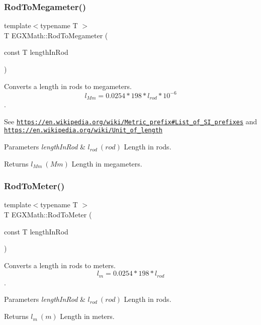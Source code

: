 \subsubsection{\texorpdfstring{Rod\+To\+Megameter()}{RodToMegameter()}}
{\footnotesize\ttfamily template$<$typename T $>$ \\
T E\+G\+X\+Math\+::\+Rod\+To\+Megameter (\begin{DoxyParamCaption}\item[{const T}]{length\+In\+Rod }\end{DoxyParamCaption})}



Converts a length in rods to megameters. \[ l_{Mm}=0.0254 * 198 * l_{rod} * 10^{-6} \]. 

See \href{https://en.wikipedia.org/wiki/Metric_prefix#List_of_SI_prefixes}{\tt https\+://en.\+wikipedia.\+org/wiki/\+Metric\+\_\+prefix\#\+List\+\_\+of\+\_\+\+S\+I\+\_\+prefixes} and \href{https://en.wikipedia.org/wiki/Unit_of_length}{\tt https\+://en.\+wikipedia.\+org/wiki/\+Unit\+\_\+of\+\_\+length} 
\begin{DoxyParams}{Parameters}
{\em length\+In\+Rod} & $ l_{rod}\ (rod)$ Length in rods. \\
\hline
\end{DoxyParams}
\begin{DoxyReturn}{Returns}
$ l_{Mm}\ (Mm)$ Length in megameters. 
\end{DoxyReturn}
\mbox{\label{group___e_g_x_math-_conversions-_length_conversions-_surveyors-_rod-_s_i_gabe33821aac19a508109735df98a1e74c}} 
\subsubsection{\texorpdfstring{Rod\+To\+Meter()}{RodToMeter()}}
{\footnotesize\ttfamily template$<$typename T $>$ \\
T E\+G\+X\+Math\+::\+Rod\+To\+Meter (\begin{DoxyParamCaption}\item[{const T}]{length\+In\+Rod }\end{DoxyParamCaption})}



Converts a length in rods to meters. \[ l_{m}=0.0254 * 198 * l_{rod} \]. 


\begin{DoxyParams}{Parameters}
{\em length\+In\+Rod} & $ l_{rod}\ (rod)$ Length in rods. \\
\hline
\end{DoxyParams}
\begin{DoxyReturn}{Returns}
$ l_{m}\ (m)$ Length in meters. 
\end{DoxyReturn}
\mbox{\label{group___e_g_x_math-_conversions-_length_conversions-_surveyors-_rod-_s_i_ga8821e67ddd408e4b4b9c4d1512b6a9d8}} 
